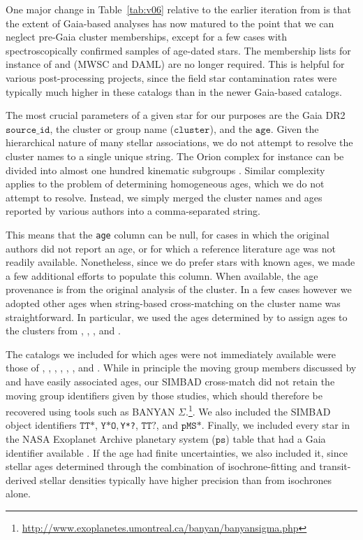 \documentclass[12pt,modern,twocolumn,tighten]{aastex63}
\begin{document}
One major change in Table~\ref{tab:v06} relative to the earlier
iteration from \citet{bouma_cdipsI_2019} is that the extent of
Gaia-based analyses has now matured to the point that we can neglect
pre-Gaia cluster memberships, except for a few cases with
spectroscopically confirmed samples of age-dated stars.  The
membership lists for instance of \citet{Kharchenko_et_al_2013} and
\citet{dias_proper_2014} (MWSC and DAML) are no longer required.  This
is helpful for various post-processing projects,  since the field star
contamination rates were typically much higher in these catalogs than
in the newer Gaia-based catalogs.

The most crucial parameters of a given star for our purposes are the
Gaia DR2 $\texttt{source\_id}$, the cluster or group name
($\texttt{cluster}$), and the $\texttt{age}$.  Given the hierarchical
nature of many stellar associations, we do not attempt to resolve the
cluster names to a single unique string.  The Orion complex for
instance can be divided into almost one hundred kinematic subgroups
\citep{kounkel_apogee2_2018}.  Similar complexity applies to the
problem of determining homogeneous ages, which we do not attempt to
resolve.  Instead, we simply merged the cluster names and ages
reported by various authors into a comma-separated string.

This means that the \texttt{age} column can be null, for cases in
which the original authors did not report an age, or for which a
reference literature age was not readily available.  Nonetheless,
since we do prefer stars with known ages, we made a few additional
efforts to populate this column.  When available, the age provenance
is from the original analysis of the cluster.  In a few cases however
we adopted other ages when string-based cross-matching on the cluster
name was straightforward.  In particular, we used the ages determined
by \citet{CantatGaudin2020b} to assign ages to the clusters from
\citet{GaiaCollaboration2018}, \citet{CantatGaudin2018a},
\citet{CastroGinard2020}, and \citet{CantatGaudin2020a}.

The catalogs we included for which ages were not immediately available
were those of \citet{CottenSong2016}, \citet{Oh2017},
\citet{Zari2018}, \citet{Gagne2018b}, \citet{Gagne2018a},
\citet{Gagne2018c}, and \citet{Ujjwal2020}.  While in principle the
moving group members discussed by
\citet{Gagne2018b,Gagne2018a,Gagne2018c} and \citet{Ujjwal2020} have
easily associated ages, our SIMBAD cross-match did not retain the
moving group identifiers given by those studies, which should
therefore be recovered using tools such as BANYAN
$\Sigma$.\footnote{\url{http://www.exoplanetes.umontreal.ca/banyan/banyansigma.php}}.
We also included the SIMBAD object identifiers $\texttt{TT*}$,
$\texttt{Y*O}, $\texttt{Y*?}, $\texttt{TT?}$, and $\texttt{pMS*}$.
Finally, we  included every star in the NASA Exoplanet Archive
planetary system ($\texttt{ps}$) table that had a Gaia identifier
available \citep{NASAExoArchive_ps_20210506}.  If the age had finite
uncertainties, we also included it, since stellar ages determined
through the combination of isochrone-fitting and transit-derived
stellar densities typically have higher precision than from isochrones
alone.
\end{document}
